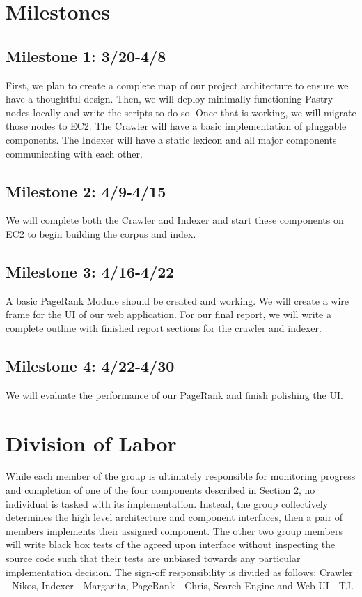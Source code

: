 \documentclass[11pt, letterpaper, oneside, twocolumn]{article}
\begin{document}
\section{ Milestones }

\subsection{Milestone 1: 3/20-4/8}
First, we plan to create a complete map of our project architecture to ensure we
have a thoughtful design. Then, we will deploy minimally functioning
Pastry nodes locally and write the scripts to do so. Once that is
working, we will migrate those nodes to EC2. The Crawler will have a basic
implementation of pluggable components. The Indexer will have a static lexicon
and all major components communicating with each other. 


\subsection{Milestone 2: 4/9-4/15}
We will complete both the Crawler and Indexer and start these components on EC2
to begin building the corpus and index. 


\subsection{Milestone 3: 4/16-4/22}
A basic PageRank Module should be created and working. We will create a wire
frame for the UI of our web application. For our final report, we will write a complete outline with finished report sections for the crawler
and indexer. 


\subsection{Milestone 4: 4/22-4/30}
We will evaluate the performance of our PageRank and finish polishing the UI. 


\section{ Division of Labor }

While each member of the group is ultimately responsible for monitoring progress and completion of one of the four components described in Section 2, no individual is tasked with its implementation.  Instead, the group collectively determines the high level architecture and component interfaces, then a pair of members implements their assigned component.  The other two group members will write black box tests of the agreed upon interface without inspecting the source code such that their tests are unbiased towards any particular implementation decision. The sign-off responsibility is divided as follows: Crawler - Nikos, Indexer - Margarita, PageRank - Chris, Search Engine and Web UI - TJ.
\end{document}
